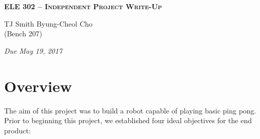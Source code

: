 \documentclass[letterpaper, 11pt]{article}
\begin{document}
    \begin{center}
        \large
        \textsc{\textbf{ELE 302 -- Independent Project Write-Up}} \vspace{5pt}

        \normalsize
        TJ Smith \hspace{1cm} Byung-Cheol Cho \\
        (Bench 207) \vspace{5pt}

        \emph{Due May 19, 2017}
        \normalsize
    \end{center}

\section{Overview}
The aim of this project was to build a robot capable of playing basic ping pong. Prior to beginning this project, we established four ideal objectives for the end product:
\end{document}
